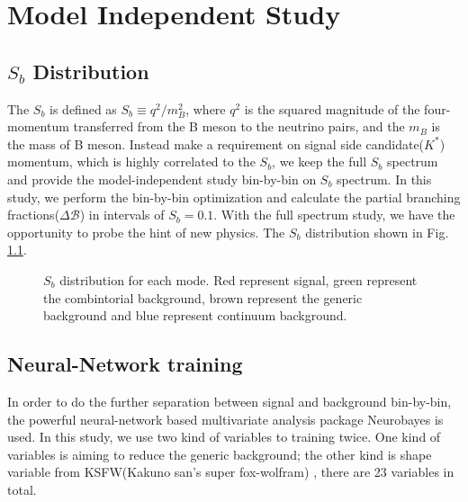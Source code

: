 \chapter{Model Independent Study}
\section{$S_b$ Distribution}
The $S_b$ is defined as $S_b \equiv q^2/m^2_B$, where $q^2$ is the squared magnitude of the four-momentum transferred from the B meson to the neutrino pairs, and the $m_B$ is the mass of B meson.  Instead make a requirement on signal side candidate($K^*$) momentum, which is highly correlated to the $S_b$, we keep the full $S_b$ spectrum and provide the model-independent study bin-by-bin on $S_b$ spectrum. In this study, we perform the bin-by-bin optimization and calculate the partial branching fractions($\Delta \mathcal{B}$) in intervals of $S_b = 0.1$. With the full spectrum study, we have the opportunity to probe the hint of new physics. The $S_b$ distribution shown in Fig. \ref{fig:sb}.
    \begin{figure}[ht]
	\centering
\caption{$S_b$ distribution for each mode. Red represent signal, green represent the combintorial background,  brown represent the generic background and blue represent continuum background.}
\label{fig:sb}	
\end{figure}
\section{Neural-Network training}
In order to do the further separation between signal and background bin-by-bin, the powerful neural-network based multivariate analysis package Neurobayes is used. In this study, we use two kind of variables to training twice. One kind of variables is aiming to reduce the generic background; the other kind is shape variable from KSFW(Kakuno san's super fox-wolfram)\cite{ref:Lee2003} \cite{ref:fox1978}, there are 23 variables in total. 
